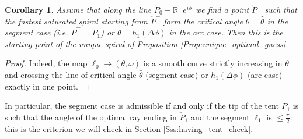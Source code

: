 \documentclass[reqno]{amsart}
\theoremstyle{definition} \newtheorem{definition}{Definition}[section]
\theoremstyle{definition} \newtheorem{remark}[definition]{Remark}
\theoremstyle{plain} \newtheorem{lemma}[definition]{Lemma}
\theoremstyle{plain} \newtheorem{proposition}[definition]{Proposition}
\theoremstyle{plain} \newtheorem{theorem}[definition]{Theorem}
\theoremstyle{plain} \newtheorem{corollary}[definition]{Corollary}
\theoremstyle{definition} \newtheorem{example}[definition]{Example}
\theoremstyle{plain} \newtheorem{claim}[clai]{Claim}
\theoremstyle{definition} \newtheorem{assumption}[definition]{Assumption}
\theoremstyle{definition} \newtheorem{observation}[definition]{Observation}
\newcommand{\R}{\mathbb{R}}
\newcommand{\1}{\mathbbm 1}
\numberwithin{equation}{section} %
\theoremstyle{plain} \newtheorem*{theorem*}{Theorem}
\theoremstyle{plain} \newtheorem{mthm}[maintheorem]{Main Theorem}
\theoremstyle{plain} \newtheorem*{mthm*}{Main Theorem}
\theoremstyle{plain} \newtheorem*{conjecture*}{Conjecture}
\theoremstyle{plain} \newtheorem{conjecture}[definition]{Conjecture}
\theoremstyle{plain} \newtheorem*{problem*}{Problem}
\begin{document}
\begin{corollary}
\label{Cor:unique}
Assume that along the line $\check P_0 + \R^+ e^{i \bar \phi}$ we find a point $\check P^-$ such that the fastest saturated spiral starting from $\check P^-$ form the critical angle $\theta = \hat \theta$ in the segment case (i.e. $\check P^- = \check P_1$) or $\theta = h_1(\Delta \phi)$ in the arc case. Then this is the starting point of the unique spiral of Proposition \ref{Prop:unique_optimal_guess}.
\end{corollary}

\begin{proof}
Indeed, the map $\ell_0 \to (\theta,\omega)$ is a smooth curve strictly increasing in $\theta$ and crossing the line of critical angle $\bar \theta$ (segment case) or $h_1(\Delta \phi)$ (arc case) exactly in one point.
\end{proof}

In particular, the segment case is admissible if and only if the tip of the tent $\check P_1$ is such that the angle of the optimal ray ending in $\check P_1$ and the segment $\ell_1$ is $\leq \frac{\pi}{2}$: this is the criterion we will check in Section \ref{Sss:having_tent_check}.

\end{document}
